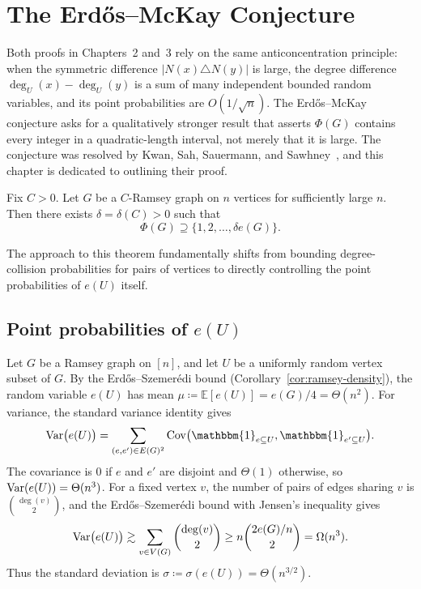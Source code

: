 \section{The Erd\H{o}s--McKay Conjecture}
\label{sec:ch4}

Both proofs in Chapters~2 and~3 rely on the same anticoncentration principle: when the symmetric difference $|N(x) \triangle N(y)|$ is large, the degree difference $\deg_U(x) - \deg_U(y)$ is a sum of many independent bounded random variables, and its point probabilities are $O(1/\sqrt{n})$. The Erd\H{o}s--McKay conjecture asks for a qualitatively stronger result that asserts $\Phi(G)$ contains every integer in a quadratic-length interval, not merely that it is large. The conjecture was resolved by Kwan, Sah, Sauermann, and Sawhney~\cite{Kwan_2023}, and this chapter is dedicated to outlining their proof. 
\begin{theorem}
  \label{thm:em}
  Fix $C > 0$. Let $G$ be a $C$-Ramsey graph on $n$ vertices for sufficiently large $n$. Then there exists $\delta = \delta(C) > 0$ such that
  \[
    \Phi(G) \supseteq \bigl\{1, 2, \ldots, \delta e(G)\bigr\}.
  \]
\end{theorem}

The approach to this theorem fundamentally shifts from bounding degree-collision probabilities for pairs of vertices to directly controlling the point probabilities of $e(U)$ itself.

\subsection{Point probabilities of $e(U)$}

Let $G$ be a Ramsey graph on $[n]$, and let $U$ be a uniformly random vertex subset of $G$. By the Erd\H{o}s--Szemer\'{e}di bound (Corollary~\ref{cor:ramsey-density}), the random variable $e(U)$ has mean $\mu \coloneqq \mathbb{E}[e(U)] = e(G)/4 = \Theta(n^2)$. For variance, the standard variance identity gives
\[
  \Var\bigl(e(U)\bigr) = \sum_{(e, e') \in E(G)^2} \Cov\bigl(\mathbbm{1}_{e \subseteq U}, \mathbbm{1}_{e' \subseteq U}\bigr).
\]
The covariance is $0$ if $e$ and $e'$ are disjoint and $\Theta(1)$ otherwise, so $\operatorname{Var}(e(U)) = \Theta(n^3)$. For a fixed vertex $v$, the number of pairs of edges sharing $v$ is $\binom{\deg(v)}{2}$, and the Erd\H{o}s--Szemer\'{e}di bound with Jensen's inequality gives
\[
  \operatorname{Var}\bigl(e(U)\bigr) \gtrsim \sum_{v \in V(G)} \binom{\operatorname{deg}(v)}{2} \geq n\binom{2e(G)/n}{2} = \Omega(n^3).
\]
Thus the standard deviation is $\sigma \coloneqq \sigma(e(U)) = \Theta(n^{3/2})$. 

